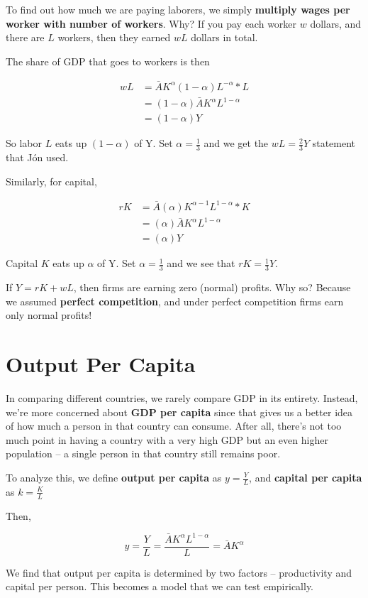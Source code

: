 \documentclass[11pt]{scrartcl}
\newcommand{\jon}{Jón }
\begin{document}
To find out how much we are paying laborers, we simply \textbf{multiply wages per worker with number of workers}. Why? If you pay each worker $w$ dollars, and there are $L$ workers, then they earned $wL$ dollars in total.

The share of GDP that goes to workers is then

\begin{align*}
wL &= \bar{A}K^{\alpha}(1-\alpha)L^{-\alpha} * L\\
&= (1-\alpha)\bar{A}K^{\alpha}L^{1-\alpha} \\
&= (1-\alpha)Y
\end{align*}

So labor $L$ eats up $(1-\alpha)$ of Y. Set $\alpha = \frac{1}{3}$ and we get the $wL = \frac{2}{3}Y$ statement that \jon used.

Similarly, for capital,

\begin{align*}
rK &= \bar{A}(\alpha)K^{\alpha-1}L^{1-\alpha} * K\\
&= (\alpha)\bar{A}K^{\alpha}L^{1-\alpha} \\
&= (\alpha)Y
\end{align*}

Capital $K$ eats up $\alpha$ of Y. Set $\alpha = \frac{1}{3}$ and we see that $rK = \frac{1}{3}Y$. 

If $Y = rK + wL$, then firms are earning zero (normal) profits. Why so? Because we assumed \textbf{perfect competition}, and under perfect competition firms earn only normal profits!

\section{Output Per Capita}

In comparing different countries, we rarely compare GDP in its entirety. Instead, we're more concerned about \textbf{GDP per capita} since that gives us a better idea of how much a person in that country can consume. After all, there's not too much point in having a country with a very high GDP but an even higher population -- a single person in that country still remains poor.

To analyze this, we define \textbf{output per capita} as $y = \frac{Y}{L}$, and \textbf{capital per capita} as $k = \frac{K}{L}$

Then,

\[ y = \frac{Y}{L} = \frac{\bar{A}K^{\alpha}L^{1-\alpha}}{L} = \bar{A}K^{\alpha} \]

We find that output per capita is determined by two factors -- productivity and capital per person. This becomes a model that we can test empirically.
\end{document}
